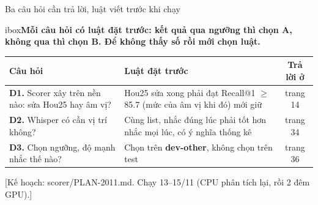 \documentclass[aspectratio=169,xcolor=table]{beamer}
\newcommand{\src}[1]{\par\vfill{\tiny\color{TextGray}[#1]}}
\newcommand{\nb}[1]{\textcolor{Accent}{#1}}
\newcommand{\insight}[1]{\begin{beamercolorbox}[sep=0.55em,rounded=true]{ibox}\small\bfseries #1\end{beamercolorbox}\vspace{0.15cm}}
\begin{document}
\begin{frame}{Ba câu hỏi cần trả lời, luật viết trước khi chạy}
\insight{Mỗi câu hỏi có \nb{luật đặt trước}: kết quả qua ngưỡng thì chọn A, không qua thì chọn B. Để không \nb{thấy số rồi mới chọn luật}.}
\renewcommand{\arraystretch}{1.3}\footnotesize
\begin{tabular}{L{4.6cm}L{6.6cm}c}
\toprule
Câu hỏi & Luật đặt trước & Trả lời ở \\
\midrule
\textbf{D1.} Scorer xây trên nền nào: sửa Hou25 hay âm vị? & Hou25 sửa xong phải đạt Recall@1 $\geq$ 85.7 (mức của âm vị khi đó) mới giữ & trang 14 \\
\textbf{D2.} Whisper có cần vị trí không? & Cùng list, nhắc đúng lúc phải tốt hơn nhắc mọi lúc, có ý nghĩa thống kê & trang 34 \\
\textbf{D3.} Chọn ngưỡng, độ mạnh nhắc thế nào? & Chọn trên \textbf{dev-other}, không chọn trên test & trang 36 \\
\bottomrule
\end{tabular}
\src{Kế hoạch: scorer/PLAN-2011.md. Chạy 13--15/11 (CPU phân tích lại, rồi 2 đêm GPU).}
\end{frame}
\end{document}
